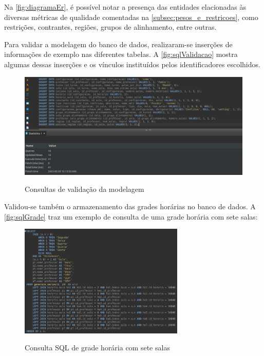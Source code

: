 Na \autoref{fig:diagramaEr}, é possível notar a presença das entidades elacionadas às diversas métricas de qualidade comentadas na \autoref{subsec:pesos_e_restricoes}, como restrições, contrantes, regiões, grupos de alinhamento, entre outras.

Para validar a modelagem do banco de dados, realizaram-se inserções de informações de exemplo nas diferentes tabelas. A \autoref{fig:sqlValidacao} mostra algumas dessas inserções e os vínculos instituídos pelos identificadores escolhidos.

\begin{figure}[!htb]
	\centering
	\caption{Consultas de validação da modelagem}
	\includegraphics[width=1\textwidth]{./dados/figuras/sql_validacao}
	\label{fig:sqlValidacao}
\end{figure}
\newpage

Validou-se também o armazenamento das grades horárias no banco de dados. A \autoref{fig:sqlGrade} traz um exemplo de consulta de uma grade horária com sete salas:

\begin{figure}[!htb]
	\centering
	\caption{Consulta SQL de grade horária com sete salas}
	\includegraphics[width=0.7\textwidth]{./dados/figuras/sql_grade}
	\label{fig:sqlGrade}
\end{figure}

